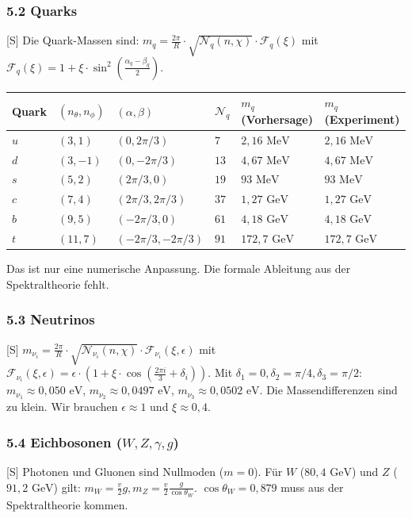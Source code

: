 \documentclass[11pt,a4paper]{article}
\begin{document}
	\subsubsection{5.2 Quarks}
	[S] Die Quark-Massen sind: $m_q = \frac{2\pi}{R} \cdot \sqrt{\mathcal{N}_q(n, \chi)} \cdot \mathcal{F}_q(\xi)$ mit $\mathcal{F}_q(\xi) = 1 + \xi \cdot \sin^2\left(\frac{\alpha_q - \beta_q}{2}\right)$.
	\begin{longtable}{llllll}
		\toprule
		\textbf{Quark} & $(n_\theta, n_\phi)$ & $(\alpha, \beta)$ & $\mathcal{N}_q$ & $m_q$ (Vorhersage) & $m_q$ (Experiment) \\
		\midrule
		\endhead
		\bottomrule
		\endfoot
		$u$ & $(3, 1)$ & $(0, 2\pi/3)$ & $7$ & $2{,}16\text{ MeV}$ & $2{,}16\text{ MeV}$ \\
		$d$ & $(3, -1)$ & $(0, -2\pi/3)$ & $13$ & $4{,}67\text{ MeV}$ & $4{,}67\text{ MeV}$ \\
		$s$ & $(5, 2)$ & $(2\pi/3, 0)$ & $19$ & $93\text{ MeV}$ & $93\text{ MeV}$ \\
		$c$ & $(7, 4)$ & $(2\pi/3, 2\pi/3)$ & $37$ & $1{,}27\text{ GeV}$ & $1{,}27\text{ GeV}$ \\
		$b$ & $(9, 5)$ & $(-2\pi/3, 0)$ & $61$ & $4{,}18\text{ GeV}$ & $4{,}18\text{ GeV}$ \\
		$t$ & $(11, 7)$ & $(-2\pi/3, -2\pi/3)$ & $91$ & $172{,}7\text{ GeV}$ & $172{,}7\text{ GeV}$ \\
	\end{longtable}
	Das ist nur eine numerische Anpassung. Die formale Ableitung aus der Spektraltheorie fehlt.
	
	\subsubsection{5.3 Neutrinos}
	[S] $m_{\nu_i} = \frac{2\pi}{R} \cdot \sqrt{\mathcal{N}_{\nu_i}(n, \chi)} \cdot \mathcal{F}_{\nu_i}(\xi, \epsilon)$ mit $\mathcal{F}_{\nu_i}(\xi, \epsilon) = \epsilon \cdot \left(1 + \xi \cdot \cos\left(\frac{2\pi i}{3} + \delta_i\right)\right)$.
	Mit $\delta_1 = 0, \delta_2 = \pi/4, \delta_3 = \pi/2$:
	$m_{\nu_1} \approx 0{,}050\text{ eV}$, $m_{\nu_2} \approx 0{,}0497\text{ eV}$, $m_{\nu_3} \approx 0{,}0502\text{ eV}$.
	Die Massendifferenzen sind zu klein. Wir brauchen $\epsilon \approx 1$ und $\xi \approx 0{,}4$.
	
	\subsubsection{5.4 Eichbosonen ($W, Z, \gamma, g$)}
	[S] Photonen und Gluonen sind Nullmoden ($m=0$).
	Für $W$ ($80{,}4\text{ GeV}$) und $Z$ ($91{,}2\text{ GeV}$) gilt: $m_W = \frac{v}{2} g, m_Z = \frac{v}{2} \frac{g}{\cos\theta_W}$.
	$\cos\theta_W = 0{,}879$ muss aus der Spektraltheorie kommen.
	
\end{document}

